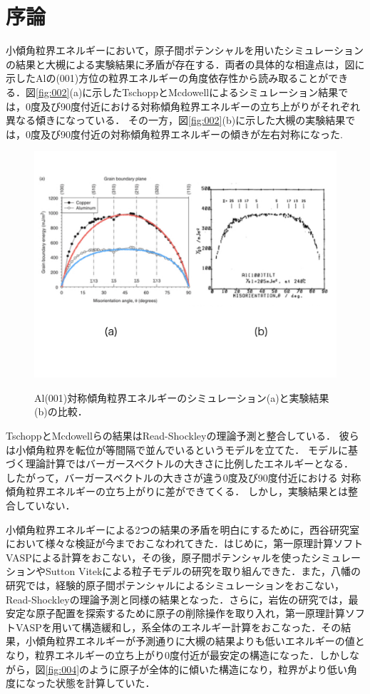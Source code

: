 
\section{序論}
小傾角粒界エネルギーにおいて，原子間ポテンシャルを用いたシミュレーションの結果と大槻による実験結果に矛盾が存在する．両者の具体的な相違点は，図に示したAlの(001)方位の粒界エネルギーの角度依存性から読み取ることができる．図\ref{fig:002}(a)に示したTschoppとMcdowellによるシミュレーション結果では，0度及び90度付近における対称傾角粒界エネルギーの立ち上がりがそれぞれ異なる傾きになっている\cite{TschoppMcdowell}．
その一方，図\ref{fig:002}(b)に示した大槻の実験結果では，0度及び90度付近の対称傾角粒界エネルギーの傾きが左右対称になった\cite{Otsuki}.

\begin{figure}[htbp]\begin{center}
\includegraphics[width=12cm,bb= 0 0 937 753]{../figs/./boundary_energy_calc_exp.jpeg}
\caption{Al(001)対称傾角粒界エネルギーのシミュレーション(a)と実験結果(b)の比較．}
\label{fig:002}
\label{default}\end{center}\end{figure}
TschoppとMcdowellらの結果はRead-Shockleyの理論予測と整合している．
彼らは小傾角粒界を転位が等間隔で並んでいるというモデルを立てた\cite{ReadShockley}．
モデルに基づく理論計算ではバーガースベクトルの大きさに比例したエネルギーとなる．
したがって，バーガースベクトルの大きさが違う0度及び90度付近における
対称傾角粒界エネルギーの立ち上がりに差ができてくる．
しかし，実験結果とは整合していない．

小傾角粒界エネルギーによる2つの結果の矛盾を明白にするために，西谷研究室において様々な検証が今までおこなわれてきた．はじめに，第一原理計算ソフトVASPによる計算をおこない，その後，原子間ポテンシャルを使ったシミュレーションやSutton Vitekによる粒子モデルの研究を取り組んできた\cite{Murakami}．また，八幡の研究では，経験的原子間ポテンシャルによるシミュレーションをおこない，Read-Shockleyの理論予測と同様の結果となった\cite{Yahata}．さらに，岩佐の研究では，最安定な原子配置を探索するために原子の削除操作を取り入れ，第一原理計算ソフトVASPを用いて構造緩和し，系全体のエネルギー計算をおこなった\cite{Iwasa}．その結果，小傾角粒界エネルギーが予測通りに大槻の結果よりも低いエネルギーの値となり，粒界エネルギーの立ち上がり0度付近が最安定の構造になった．しかしながら，図\ref{fig:004}のように原子が全体的に傾いた構造になり，粒界がより低い角度になった状態を計算していた．

